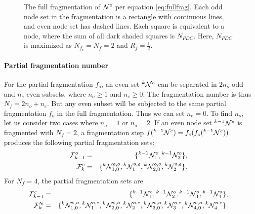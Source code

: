 \begin{figure}
  \caption{The full fragmentation of $\mathcal{N}^o$ per equation \ref{eq:fullfrag}. Each odd node set in the fragmentation is a rectangle with continuous lines, and even node set has dashed lines. Each square is equivalent to a node, where the sum of all dark shaded squares is $N_{PDC}$. Here, $N_{PDC}$ is maximized as $N_{f_e} = N_{f} = 2$ and $R_j = \frac{1}{2}$. }\label{fig:fragcorrect}
\end{figure}

\paragraph{Partial fragmentation number}
For the partial fragmentation $f_o$, an even set ${}^{k}\mathcal{N}^e$ can be separated in $2n_o$ odd and $n_e$ even subsets, where $n_o\geq 1$ and $n_e \geq 0$. The fragmentation number is thus $N_f = 2n_o + n_e$. But any even subset will be subjected to the same partial fragmentation $f_o$ in the full fragmentation. Thus we can set $n_e=0$. To find $n_o$, let us consider two cases where $n_o = 1$ or $n_o=2$. If an even node set ${}^{k-1}\mathcal{N}^e$ is fragmented with $N_{f}=2$, a fragmentation step $f({}^{k-1}\mathcal{N}^e)=f_e(f_o({}^{k-1}\mathcal{N}^e))$ produces the following partial fragmentation sets:
\begin{eqnarray*}
  \mathcal{F}^o_{k-1} &=& \{ {}^{k-1} \mathcal{N}^{o}_1, {}^{k-1} \mathcal{N}^{o}_2\},  \\
  \mathcal{F}^e_{k} &=& \{{}^{k}\mathcal{N}^{o,o}_{1,0}, {}^{k}\mathcal{N}^{o,e}_1, {}^{k}\mathcal{N}^{o,o}_{2,0}, {}^{k}\mathcal{N}^{o,e}_2 \}.
\end{eqnarray*}
For $N_{f} = 4$, the partial fragmentation sets are
\begin{eqnarray*}
  \mathcal{F}^e_{k-1} &=& \{ {}^{k-1}\mathcal{N}^{o}_1, {}^{k-1}\mathcal{N}^{o}_2,  {}^{k-1}\mathcal{N}^{o}_3, {}^{k-1}\mathcal{N}^{o}_4\},  \\
  \mathcal{F}'^e_{k} &=& \{{}^{k}\mathcal{N}^{o,o}_{1,0}, {}^{k}\mathcal{N}^{o,e}_1,  {}^{k}\mathcal{N}^{o,o}_{2,0}, {}^{k}\mathcal{N}^{o,e}_2,  {}^{k}\mathcal{N}^{o,o}_{3,0}, {}^{k}\mathcal{N}^{o,e}_3, {}^{k}\mathcal{N}^{o,o}_{4,0}, {}^{k}\mathcal{N}^{o,e}_4 \}.
\end{eqnarray*}

